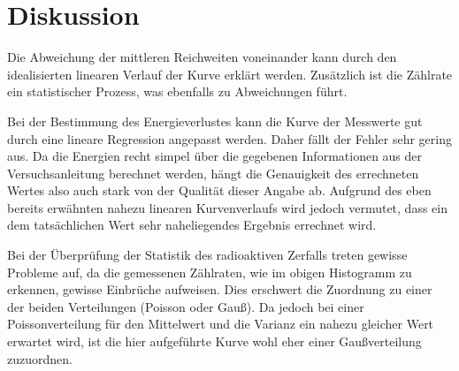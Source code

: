 \section{Diskussion}
\label{sec:Diskussion}

Die Abweichung der mittleren Reichweiten voneinander kann durch den idealisierten linearen Verlauf der Kurve erklärt werden. Zusätzlich ist
die Zählrate ein statistischer Prozess, was ebenfalls zu Abweichungen führt.

Bei der Bestimmung des Energieverlustes kann die Kurve der Messwerte gut durch eine lineare Regression angepasst werden. Daher fällt der Fehler
sehr gering aus. Da die Energien recht simpel über die gegebenen Informationen aus der Versuchsanleitung \cite{sample} berechnet werden, hängt
die Genauigkeit des errechneten Wertes also auch stark von der Qualität dieser Angabe ab. Aufgrund des eben bereits erwähnten nahezu linearen
Kurvenverlaufs wird jedoch vermutet, dass ein dem tatsächlichen Wert sehr naheliegendes Ergebnis errechnet wird.

Bei der Überprüfung der Statistik des radioaktiven Zerfalls treten gewisse Probleme auf, da die gemessenen Zählraten, wie im obigen Histogramm zu
erkennen, gewisse Einbrüche aufweisen. Dies erschwert die Zuordnung zu einer der beiden Verteilungen (Poisson oder Gauß). Da jedoch bei einer
Poissonverteilung für den Mittelwert und die Varianz ein nahezu gleicher Wert erwartet wird, ist die hier aufgeführte Kurve wohl eher einer
Gaußverteilung zuzuordnen.
